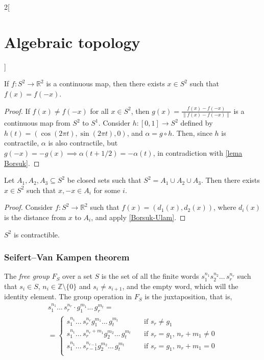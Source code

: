 \documentclass[../../../main.tex]{subfiles}
\begin{document}
\begin{multicols}{2}[\section{Algebraic topology}]
	\begin{theorem}
		\label{Borsuk-Ulam}
		If $f:S^2 \to \mathbb{R}^2$ is a continuous map, then there exists $x\in S^2$ such that $f(x)=f(-x)$.
	\end{theorem}
	
	\begin{proof}
		If $f(x)\neq f(-x)$ for all $x\in S^2$, then $g(x)=\frac{f(x)-f(-x)}{\|f(x)-f(-x)\|}$ is a continuous map from $S^2$ to $S^1$. Consider $h:[0,1] \to S^2$ defined by $h(t)=(\cos(2\pi t), \sin(2\pi t), 0)$, and $\alpha = g \circ h$. Then, since $h$ is contractile, $\alpha$ is also contractile, but $g(-x)=-g(x)\implies \alpha(t+1/2)=-\alpha(t)$, in contradiction with \cref{lema Borsuk}.
	\end{proof}
	
	\begin{corollary}
		Let $A_1, A_2, A_3\subseteq S^2$ be closed sets such that $S^2=A_1\cup A_2 \cup A_3$. Then there exists $x\in S^2$ such that $x,-x \in A_i$ for some $i$.
	\end{corollary}

	\begin{proof}
		Consider $f: S^2 \to \mathbb{R}^2$ such that $f(x)=(d_1(x), d_2(x))$, where $d_i(x)$ is the distance from $x$ to $A_i$, and apply \cref{Borsuk-Ulam}.
	\end{proof}
	
	\begin{proposition}
		$S^2$ is contractible.
	\end{proposition}
	
	\subsubsection{Seifert–Van Kampen theorem}
	\begin{definition}
		The \emph{free group} $F_S$ over a set $S$ is the set of all the finite words $s_1^{n_1}s_2^{n_2}...\,s_r^{n_r}$ such that $s_i \in S$, $n_i \in \mathbb{Z}\setminus\{0\}$ and $s_i \neq s_{i+1}$, and the empty word, which will the identity element. The group operation in $F_S$ is the juxtaposition, that is, 
		\begin{multline*}
			s_1^{n_1}...\,s_r^{n_r} \cdot g_1^{m_1}...\,g_r^{m_t}=\\
			= \begin{cases}
				s_1^{n_1}...\,s_r^{n_r}g_1^{m_1}...\,g_t^{m_t} & \quad\text{if  } s_r\neq g_1 \\
				s_1^{n_1}...\,s_r^{n_r+m_1}g_2^{m_2}...\,g_t^{m_t}  & \quad\text{if }s_r = g_1 \text{, } n_r+m_1 \neq 0\\
				s_1^{n_1}...\,s_{r-1}^{n_{r-1}}g_2^{m_2}...\,g_t^{m_t} & \quad\text{if }s_r = g_1 \text{, } n_r+m_1 = 0\\
			\end{cases}
		\end{multline*}
		

\end{definition}
\end{multicols}
\end{document}
